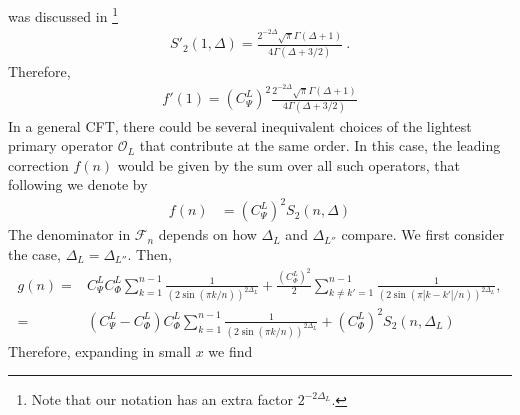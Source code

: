 \documentclass[11pt]{article}
\newcommand{\mO}{\mathcal{O}}
\newcommand{\nn}{\nonumber}
\newcommand{\JM}[1]{\textcolor{orange}{#1}}
\begin{document}
  was discussed in
  \cite{calabrese2011entanglement}\footnote{Note that our notation has an extra factor $2^{-2\Delta_L}$.}
  \begin{align}
    S'_{2}(1,\Delta)=\frac{2^{-2\Delta}\sqrt{\pi}\Gamma(\Delta+1)}{4\Gamma(\Delta+3/2)}\ .
  \end{align}
  Therefore,
  \begin{align}
    f'(1)={(C_{\Psi}^L)}^{2} \frac{2^{-2\Delta}\sqrt{\pi}\Gamma(\Delta+1)}{4\Gamma(\Delta+3/2)}
  \end{align}
  In a general CFT, there could be several inequivalent choices of the lightest primary
  operator $\mO_{L}$ that contribute at the same order. In this case, the leading
  correction $f(n)$ would be given by the sum over all such operators, that
  following \cite{calabrese2011entanglement} we denote by
  \begin{align}
    f(n) & = {(C_{\Psi}^L)}^{2} S_{2}(n,\Delta) 
  \end{align}
The denominator in $\mathcal{F}_n$ depends on how $\Delta_L$ and $\Delta_{L''}$ compare. We first consider the case, $\Delta_L=\Delta_{L''}$. Then,
  \begin{align}\label{gnw1}
    g(n)= & C_{\Psi}^LC_\Phi^L\sum_{k=1}^{n-1}\frac{1}{(2\sin(\pi k/n))^{2\Delta_L}}+\frac{{(C_\Phi^L)}^2}{2}\sum_{k\neq k'=1}^{n-1}\frac{1}{(2\sin(\pi |k-k'|/n))^{2\Delta_{L}}}, \nn\\%
    =&(C_\Psi^L -C_\Phi^L)C_\Phi^L\sum_{k=1}^{n-1}\frac{1}{(2\sin(\pi k/n))^{2\Delta_L}}+{(C_\Phi^L)}^2 S_2(n,\Delta_{L})
  \end{align}
Therefore, expanding in small $x$ we find
\end{document}
